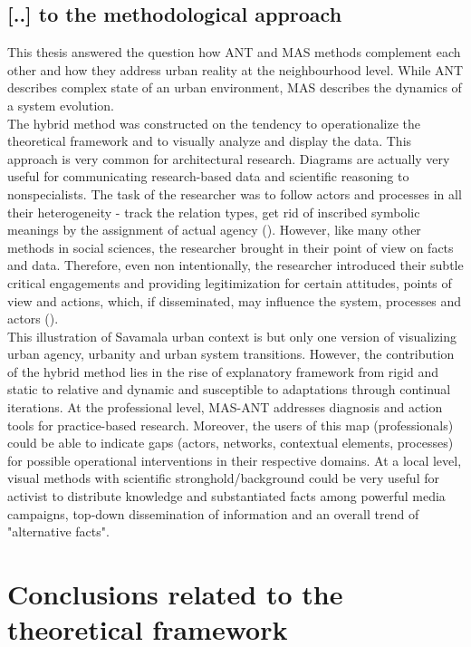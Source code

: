 \documentclass[11pt]{report}
\begin{document}
{\subsection{[..] to the methodological approach}

This thesis answered the question how ANT and MAS methods complement each other and how they address urban reality at the neighbourhood level.
While ANT describes complex state of an urban environment, MAS describes the dynamics of a system evolution.
\\

The hybrid method was constructed on the tendency to operationalize the theoretical framework and to visually analyze and display the data.
This approach is very common for architectural research.
Diagrams are actually very useful for communicating research-based data and scientific reasoning to nonspecialists.
The task of the researcher was to follow actors and processes in all their heterogeneity - track the relation types, get rid of inscribed symbolic meanings by the assignment of actual agency (\href{Nimmo}{\citealt{nimmo_actor-network_2011}}).
However, like many other methods in social sciences, 
the researcher brought in their point of view on facts and data.
Therefore, even non intentionally, the researcher introduced their subtle critical engagements and providing legitimization for certain attitudes, points of view and actions, which, if disseminated, may influence the system, processes and actors (\href{Baiocchi}{\citealt{baiocchi_actor-network_2013}}).
\\

This illustration of Savamala urban context is but only one version of visualizing urban agency, urbanity and urban system transitions.
However, the contribution of the hybrid method lies in the rise of explanatory framework from rigid and static to relative and dynamic and susceptible to adaptations through continual iterations.
At the professional level, MAS-ANT addresses diagnosis and action tools for practice-based research.
Moreover, the users of this map (professionals) could be able to indicate gaps (actors, networks, contextual elements, processes) for possible operational interventions in their respective domains.
At a local level, visual methods with scientific stronghold/background could be very useful for activist to distribute knowledge and substantiated facts among powerful media campaigns, top-down dissemination of information and an overall trend of "alternative facts".

\section{Conclusions related to the theoretical framework}

}
\end{document}
